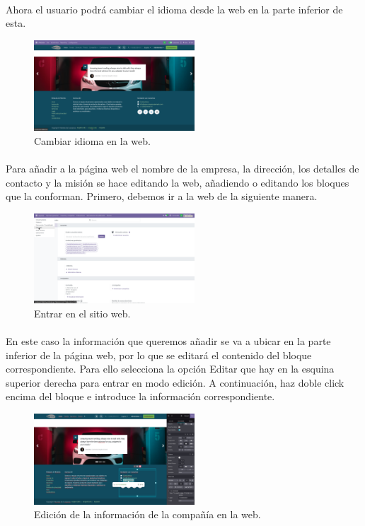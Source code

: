 \documentclass[paper=a4wide, fontsize=11pt]{report}	 %
\begin{document}
\paragraph{}
Ahora el usuario podrá cambiar el idioma desde la web en la parte inferior de esta.
\begin{figure}[h]
    \centering
    \includegraphics[width=6cm]{idiomasWeb.png}
    \caption{Cambiar idioma en la web.}
    \label{fig:faqs}
\end{figure}
\paragraph{}
Para añadir a la página web el nombre de la empresa, la dirección, los detalles de contacto y la misión se hace editando la web, añadiendo o editando los bloques que la conforman.
Primero, debemos ir a la web de la siguiente manera.
\begin{figure}[h]
    \centering
    \includegraphics[width=6cm]{sitioWeb.png}
    \caption{Entrar en el sitio web.}
    \label{fig:faqs}
\end{figure}
\paragraph{}
En este caso la información que queremos añadir se va a ubicar en la parte inferior de la página web, por lo que se editará el contenido del bloque correspondiente. Para ello selecciona la opción Editar que hay en la esquina superior derecha para entrar en modo edición. A continuación, haz doble click encima del bloque e introduce la información correspondiente.
\newpage
\begin{figure}[h]
    \centering
    \includegraphics[width=6cm]{añadirInfoCompañia.png}
    \caption{Edición de la información de la compañía en la web.}
    \label{fig:faqs}
\end{figure}
\end{document}
